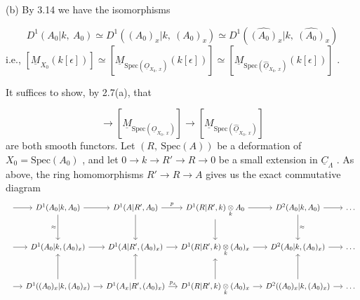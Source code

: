 (b)  By 3.14 we have the isomorphisms

\begin{equation*}
D^1(A_0|k,\ A_0) \simeq D^1((A_0)_x|k,\ (A_0)_x) \simeq D^1(\widehat{(A_0)}_x|k,\ \widehat{(A_0)}_x)
\end{equation*}
i.e.,   $[\underline{M}_{X_0}(k[\epsilon])] \simeq [\underline{M}_{\mathrm{Spec}(\underline{O}_{X_0,\ x})}(k[\epsilon])] \simeq [\underline{M}_{\mathrm{Spec}(\widehat{\underline{O}}_{X_0,\ x})}(k[\epsilon])]$ .

It suffices to show, by 2.7(a), that

\begin{equation*}
[\underline{M}_{X_0}] \to [\underline{M}_{\mathrm{Spec}(\underline{O}_{X_0,\ x})}] \to [\underline{M}_{\mathrm{Spec}(\widehat{\underline{O}}_{X_0,\ x})}]
\end{equation*}
are both smooth functors. Let  $(R,\ \mathrm{Spec}(A))$  be a deformation of  $X_0 = \mathrm{Spec}(A_0)$  , and let  $0 \to k \to R' \to R \to 0$  be a small extension in  $\underline{C}_{\Lambda}$  . As above, the ring homomorphisms  $R' \to R \to A$  gives us the exact commutative diagram
\[
\begin{tikzcd}[column sep=small, row sep=large]
{} \arrow[r] & D^1(A_0|k,A_0) \arrow[r] \arrow[d, "\approx"'] & D^1(A|R',A_0) \arrow[r, "p"] \arrow[d] & D^1(R|R',k)\underset{k}{\otimes}A_0 \arrow[r] \arrow[d] & D^2(A_0|k,A_0) \arrow[r] \arrow[d, "\approx"] & \dots \\
{} \arrow[r] & D^1(A_0|k,(A_0)_x) \arrow[r] & D^1(A|R',(A_0)_x) \arrow[r] & D^1(R|R',k)\underset{k}{\otimes}(A_0)_x \arrow[r] & D^2(A_0|k,(A_0)_x) \arrow[r] & \dots \\
{} \arrow[r] & D^1((A_0)_x|k,(A_0)_x) \arrow[r] \arrow[u] & D^1(A_x|R',(A_0)_x) \arrow[r, "p_x"] \arrow[u] & D^1(R|R',k)\underset{k}{\otimes}(A_0)_x \arrow[r] \arrow[u] & D^2((A_0)_x|k,(A_0)_x) \arrow[r] \arrow[u] & \dots
\end{tikzcd}
\]
